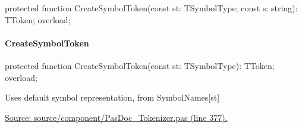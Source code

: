 \documentclass{report}
\newif\ifpdf
\begin{document}
\label{PasDoc_Tokenizer.TTokenizer-CreateSymbolToken}
\begin{list}{}{
\setlength{\itemindent}{0cm}
\setlength{\listparindent}{0cm}
\setlength{\leftmargin}{\evensidemargin}
\addtolength{\leftmargin}{\tmplength}
\settowidth{\labelsep}{X}
\addtolength{\leftmargin}{\labelsep}
\setlength{\labelwidth}{\tmplength}
}
\item[\textbf{Declaration}\hfill]
\ifpdf
\begin{flushleft}
\fi
\begin{ttfamily}
protected function CreateSymbolToken(const st: TSymbolType; const s: string): TToken; overload;\end{ttfamily}

\ifpdf
\end{flushleft}
\fi

\end{list}
\paragraph*{CreateSymbolToken}\hspace*{\fill}

\label{PasDoc_Tokenizer.TTokenizer-CreateSymbolToken}
\begin{list}{}{
\setlength{\itemindent}{0cm}
\setlength{\listparindent}{0cm}
\setlength{\leftmargin}{\evensidemargin}
\addtolength{\leftmargin}{\tmplength}
\settowidth{\labelsep}{X}
\addtolength{\leftmargin}{\labelsep}
\setlength{\labelwidth}{\tmplength}
}
\item[\textbf{Declaration}\hfill]
\ifpdf
\begin{flushleft}
\fi
\begin{ttfamily}
protected function CreateSymbolToken(const st: TSymbolType): TToken; overload;\end{ttfamily}

\ifpdf
\end{flushleft}
\fi

\par
\item[\textbf{Description}]
Uses default symbol representation, from SymbolNames[st]\par
\href{https://github.com/pasdoc/pasdoc/blob/master/source/component/PasDoc_Tokenizer.pas#L377}{Source: source/component/PasDoc{\_}Tokenizer.pas (line 377).}

\end{list}
\end{document}

